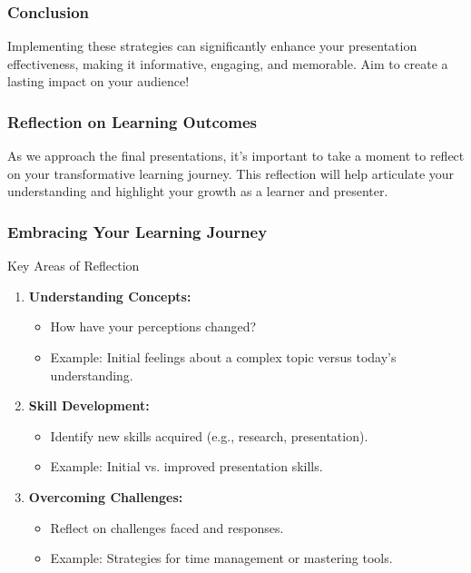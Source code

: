 \documentclass[aspectratio=169]{beamer}
\begin{document}
\begin{frame}[fragile]
    \frametitle{Conclusion}
    Implementing these strategies can significantly enhance your presentation effectiveness, making it informative, engaging, and memorable. Aim to create a lasting impact on your audience!
\end{frame}

\begin{frame}[fragile]
    \frametitle{Reflection on Learning Outcomes}
    As we approach the final presentations, it's important to take a moment to reflect on your transformative learning journey. This reflection will help articulate your understanding and highlight your growth as a learner and presenter.
\end{frame}

\begin{frame}[fragile]
    \frametitle{Embracing Your Learning Journey}
    \begin{block}{Key Areas of Reflection}
        \begin{enumerate}
            \item \textbf{Understanding Concepts:}
                \begin{itemize}
                    \item How have your perceptions changed?
                    \item Example: Initial feelings about a complex topic versus today’s understanding.
                \end{itemize}
                
            \item \textbf{Skill Development:}
                \begin{itemize}
                    \item Identify new skills acquired (e.g., research, presentation).
                    \item Example: Initial vs. improved presentation skills.
                \end{itemize}
                
            \item \textbf{Overcoming Challenges:}
                \begin{itemize}
                    \item Reflect on challenges faced and responses.
                    \item Example: Strategies for time management or mastering tools.
                \end{itemize}
        \end{enumerate}
    \end{block}
\end{frame}
\end{document}
